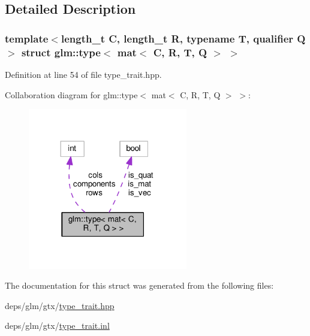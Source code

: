 \subsection{Detailed Description}
\subsubsection*{template$<$length\+\_\+t C, length\+\_\+t R, typename T, qualifier Q$>$\newline
struct glm\+::type$<$ mat$<$ C, R, T, Q $>$ $>$}



Definition at line 54 of file type\+\_\+trait.\+hpp.



Collaboration diagram for glm\+:\+:type$<$ mat$<$ C, R, T, Q $>$ $>$\+:
\nopagebreak
\begin{figure}[H]
\begin{center}
\leavevmode
\includegraphics[width=197pt]{d1/d56/structglm_1_1type_3_01mat_3_01C_00_01R_00_01T_00_01Q_01_4_01_4__coll__graph}
\end{center}
\end{figure}


The documentation for this struct was generated from the following files\+:\begin{DoxyCompactItemize}
\item 
deps/glm/gtx/\hyperlink{type__trait_8hpp}{type\+\_\+trait.\+hpp}\item 
deps/glm/gtx/\hyperlink{type__trait_8inl}{type\+\_\+trait.\+inl}\end{DoxyCompactItemize}
